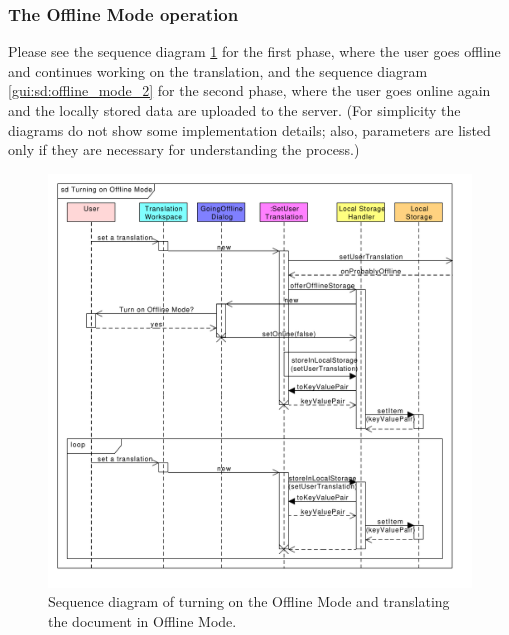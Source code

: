 \subsubsection{The Offline Mode operation}

Please see the sequence diagram \ref{gui:sd:offline_mode_1} for the first phase, where the user goes offline and continues working on the translation, and the sequence diagram \ref{gui:sd:offline_mode_2} for the second phase, where the user goes online again and the locally stored data are uploaded to the server.
(For simplicity the diagrams do not show some implementation details;
also, parameters are listed only if they are necessary for understanding the process.)

\begin{figure}[h]
\begin{center}
\includegraphics[scale=0.55]{figures/offline_mode_1.pdf}
\end{center}
\caption{Sequence diagram of turning on the Offline Mode and translating the document in Offline Mode.}\label{gui:sd:offline_mode_1}
\end{figure}

